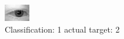 \begin{figure}[h!]
\begin{center}
\includegraphics[width=0.60\columnwidth]{figures/ID393_class_1_target_2.png}
\end{center}
\caption{ Classification: 1 actual target: 2}
\label{fig:ID393_class_1_target_2}
\end{figure}
